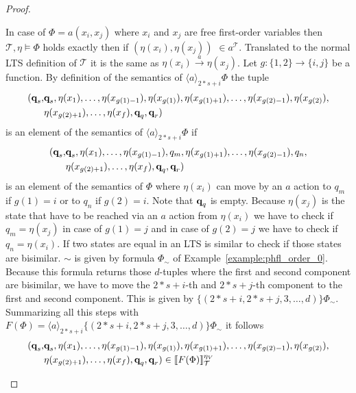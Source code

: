 \begin{proof}
\begin{compactitem}
        \item In case of $\Phi = a(x_i, x_j)$ where $x_i$ and $x_j$ are free first-order variables then $\mathcal{T}, \eta \models \Phi$ holds exactly then if $(\eta(x_i)
        , \eta(x_j))$ $ \in a^\mathcal{T}$. Translated to the normal LTS definition of $\mathcal{T}$ it is the same as $
        \eta(x_i) \overset{a}{\rightarrow} \eta(x_j)$. Let $g: \{1, 2\} \rightarrow \{i, j\}$ be a function.
        By  definition of the semantics of $\langle a \rangle_{2*s+i} \Phi$ the tuple
        \begin{align*}
            (\emph{q}_s, &\emph{q}_s, \eta(x_1), \dots, \eta(x_{g(1) - 1}), \eta(x_{g(1)}), \eta(x_{g(1)+1}), \dots, \eta(x_{g(2)-1}), \eta
            (x_{g(2)}),\\& \eta(x_{g(2)+1}), \dots, \eta(x_f), \emph{q}_q, \emph{q}_r)
        \end{align*}
        is an element of the semantics of $\langle a \rangle_{2*s+i} \Phi$ if
        \begin{align*}
            (\emph{q}_s, &\emph{q}_s, \eta(x_1), \dots, \eta(x_{g(1) - 1}), q_m, \eta(x_{g(1)+1}), \dots, \eta(x_{g(2)-1}), q_n,\\& \eta(x_{g(2)
            +1}), \dots, \eta(x_f), \emph{q}_q, \emph{q}_r)
        \end{align*}
        is an element of the semantics of $\Phi$ where $\eta(x_i)$ can
        move by an $a$ action to $q_m$ if $g(1) = i$ or to $q_n$ if $g(2) = i$. Note that $\emph{q}_q$ is empty. Because $\eta(x_j)$ is the state that
        have to be reached via an $a$ action from $\eta(x_i)$ we have to check if $q_m = \eta(x_j)$ in case of $g(1)
        = j$ and in case of $g(2) = j$ we have to check if $q_n = \eta(x_i)$. If two states are equal in an LTS is
        similar to check if those states are bisimilar. $\sim$ is given by formula $\Phi_\sim$ of
        Example~\ref{example:phfl_order_0}.
        Because this formula returns those $d$-tuples where the first and second component are bisimilar, we have to
        move the $2*s+i$-th and $2*s+j$-th component to the first and second component. This is given by $\{(2*s+i, 2*s+j, 3, \dots, d
        )\} \Phi_\sim$. Summarizing all this steps with $F(\Phi) = \langle a \rangle_{2*s+i} \{(2*s+i, 2*s+j, 3, \dots, d)\}
        \Phi_\sim$ it follows
        \begin{align*}
            (\emph{q}_s, &\emph{q}_s, \eta(x_1), \dots, \eta(x_{g(1) - 1}), \eta(x_{g(1)}), \eta(x_{g(1)+1}), \dots, \eta(x_{g(2)-1}), \eta
            (x_{g(2)}),\\& \eta(x_{g(2)+1}), \dots, \eta(x_f), \emph{q}_q, \emph{q}_r) \in \llbracket F(\Phi) \rrbracket^{\eta_V}_\mathcal{T}

\end{align*}
\end{compactitem}
\end{proof}
